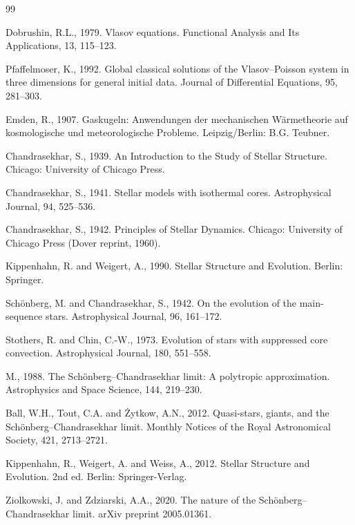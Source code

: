 \documentclass[12pt,a4paper]{article}
\numberwithin{equation}{section}
\begin{document}
\begin{thebibliography}{99}
\item Dobrushin, R.L., 1979. Vlasov equations. Functional Analysis and Its Applications, 13, 115–123.

\item Pfaffelmoser, K., 1992. Global classical solutions of the Vlasov–Poisson system in three dimensions for general initial data. Journal of Differential Equations, 95, 281–303.



\item Emden, R., 1907. Gaskugeln: Anwendungen der mechanischen Wärmetheorie auf kosmologische und meteorologische Probleme. Leipzig/Berlin: B.G. Teubner.

\item Chandrasekhar, S., 1939. An Introduction to the Study of Stellar Structure. Chicago: University of Chicago Press.

\item Chandrasekhar, S., 1941. Stellar models with isothermal cores. Astrophysical Journal, 94, 525–536.

\item Chandrasekhar, S., 1942. Principles of Stellar Dynamics. Chicago: University of Chicago Press (Dover reprint, 1960).

\item Kippenhahn, R. and Weigert, A., 1990. Stellar Structure and Evolution. Berlin: Springer.

\item Schönberg, M. and Chandrasekhar, S., 1942. On the evolution of the main-sequence stars. Astrophysical Journal, 96, 161–172.

\item Stothers, R. and Chin, C.-W., 1973. Evolution of stars with suppressed core convection. Astrophysical Journal, 180, 551–558.

\item M., 1988. The Schönberg–Chandrasekhar limit: A polytropic approximation. Astrophysics and Space Science, 144, 219–230.

\item Ball, W.H., Tout, C.A. and Żytkow, A.N., 2012. Quasi-stars, giants, and the Schönberg–Chandrasekhar limit. Monthly Notices of the Royal Astronomical Society, 421, 2713–2721.

\item Kippenhahn, R., Weigert, A. and Weiss, A., 2012. Stellar Structure and Evolution. 2nd ed. Berlin: Springer-Verlag.

\item Ziolkowski, J. and Zdziarski, A.A., 2020. The nature of the Schönberg–Chandrasekhar limit. arXiv preprint 2005.01361.


\end{thebibliography}
\end{document}
